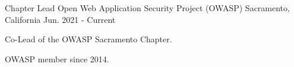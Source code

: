

\begin{cventries}
  \cventry
    {Chapter Lead} %
    {Open Web Application Security Project (OWASP)} %
    {Sacramento, California} %
    {Jun. 2021 - Current} %
    {
      \begin{cvitems} %
        \item {Co-Lead of the OWASP Sacramento Chapter.}
        \item {OWASP member since 2014.}
      \end{cvitems}
    }

\end{cventries}
